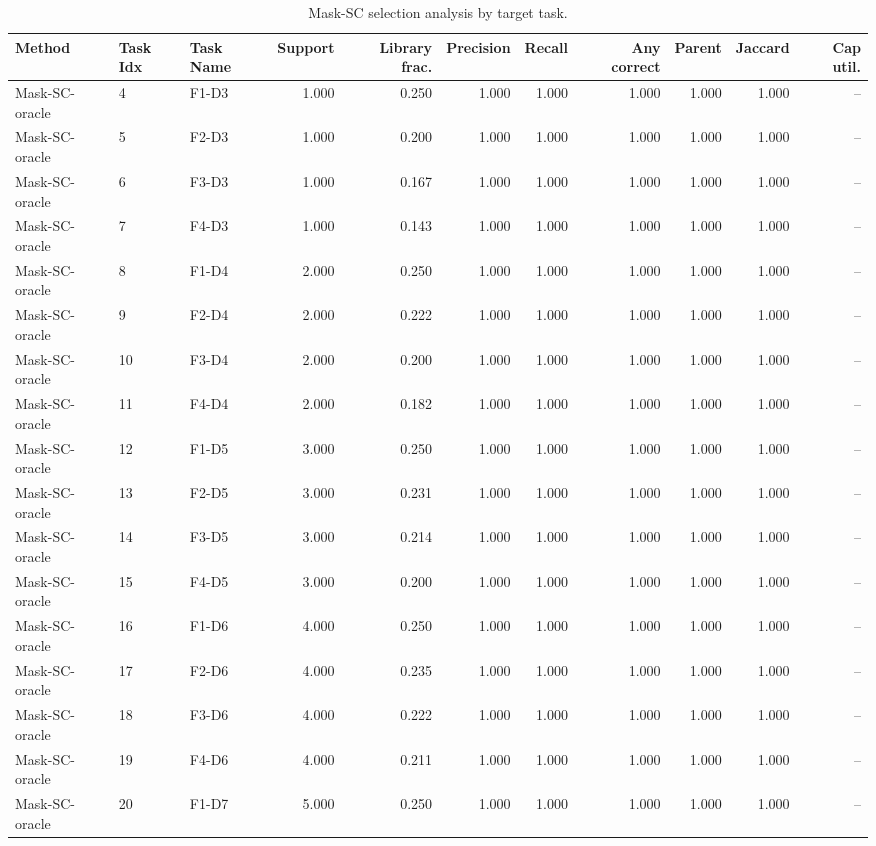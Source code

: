 \begin{table}[ht]
    \caption{Mask-SC selection analysis by target task.}
    \label{tbl:masksc_selection_task}
    \centering
    \scriptsize
    \begin{tabular}{lllrrrrrrrr}
    \toprule
Method & Task Idx & Task Name & Support & Library frac. & Precision & Recall & Any correct & Parent & Jaccard & Cap util. \\
    \midrule
Mask-SC-oracle & 4 & F1-D3 & 1.000 & 0.250 & 1.000 & 1.000 & 1.000 & 1.000 & 1.000 & -- \\
Mask-SC-oracle & 5 & F2-D3 & 1.000 & 0.200 & 1.000 & 1.000 & 1.000 & 1.000 & 1.000 & -- \\
Mask-SC-oracle & 6 & F3-D3 & 1.000 & 0.167 & 1.000 & 1.000 & 1.000 & 1.000 & 1.000 & -- \\
Mask-SC-oracle & 7 & F4-D3 & 1.000 & 0.143 & 1.000 & 1.000 & 1.000 & 1.000 & 1.000 & -- \\
Mask-SC-oracle & 8 & F1-D4 & 2.000 & 0.250 & 1.000 & 1.000 & 1.000 & 1.000 & 1.000 & -- \\
Mask-SC-oracle & 9 & F2-D4 & 2.000 & 0.222 & 1.000 & 1.000 & 1.000 & 1.000 & 1.000 & -- \\
Mask-SC-oracle & 10 & F3-D4 & 2.000 & 0.200 & 1.000 & 1.000 & 1.000 & 1.000 & 1.000 & -- \\
Mask-SC-oracle & 11 & F4-D4 & 2.000 & 0.182 & 1.000 & 1.000 & 1.000 & 1.000 & 1.000 & -- \\
Mask-SC-oracle & 12 & F1-D5 & 3.000 & 0.250 & 1.000 & 1.000 & 1.000 & 1.000 & 1.000 & -- \\
Mask-SC-oracle & 13 & F2-D5 & 3.000 & 0.231 & 1.000 & 1.000 & 1.000 & 1.000 & 1.000 & -- \\
Mask-SC-oracle & 14 & F3-D5 & 3.000 & 0.214 & 1.000 & 1.000 & 1.000 & 1.000 & 1.000 & -- \\
Mask-SC-oracle & 15 & F4-D5 & 3.000 & 0.200 & 1.000 & 1.000 & 1.000 & 1.000 & 1.000 & -- \\
Mask-SC-oracle & 16 & F1-D6 & 4.000 & 0.250 & 1.000 & 1.000 & 1.000 & 1.000 & 1.000 & -- \\
Mask-SC-oracle & 17 & F2-D6 & 4.000 & 0.235 & 1.000 & 1.000 & 1.000 & 1.000 & 1.000 & -- \\
Mask-SC-oracle & 18 & F3-D6 & 4.000 & 0.222 & 1.000 & 1.000 & 1.000 & 1.000 & 1.000 & -- \\
Mask-SC-oracle & 19 & F4-D6 & 4.000 & 0.211 & 1.000 & 1.000 & 1.000 & 1.000 & 1.000 & -- \\
Mask-SC-oracle & 20 & F1-D7 & 5.000 & 0.250 & 1.000 & 1.000 & 1.000 & 1.000 & 1.000 & -- \\

\end{tabular}
\end{table}
